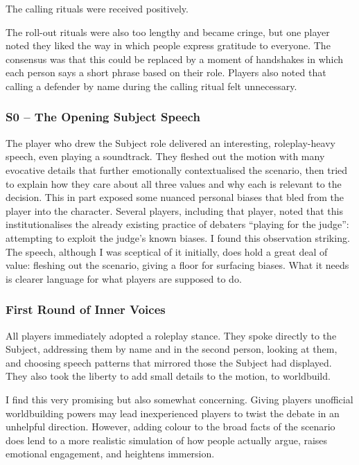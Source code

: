 \documentclass[12pt]{article}
\begin{document}
The calling rituals were received positively.

The roll-out rituals were also too lengthy and became cringe, but one player noted they liked the way in which people express gratitude to everyone. The consensus was that this could be replaced by a moment of handshakes in which each person says a short phrase based on their role. Players also noted that calling a defender by name during the calling ritual felt unnecessary.

\subsubsection{S0 -- The Opening Subject Speech}

The player who drew the Subject role delivered an interesting, roleplay-heavy speech, even playing a soundtrack. They fleshed out the motion with many evocative details that further emotionally contextualised the scenario, then tried to explain how they care about all three values and why each is relevant to the decision. This in part exposed some nuanced personal biases that bled from the player into the character. Several players, including that player, noted that this institutionalises the already existing practice of debaters ``playing for the judge'': attempting to exploit the judge's known biases. I found this observation striking. The speech, although I was sceptical of it initially, does hold a great deal of value: fleshing out the scenario, giving a floor for surfacing biases. What it needs is clearer language for what players are supposed to do.

\subsubsection{First Round of Inner Voices}

All players immediately adopted a roleplay stance. They spoke directly to the Subject, addressing them by name and in the second person, looking at them, and choosing speech patterns that mirrored those the Subject had displayed. They also took the liberty to add small details to the motion, to worldbuild.

I find this very promising but also somewhat concerning. Giving players unofficial worldbuilding powers may lead inexperienced players to twist the debate in an unhelpful direction. However, adding colour to the broad facts of the scenario does lend to a more realistic simulation of how people actually argue, raises emotional engagement, and heightens immersion.
\end{document}

